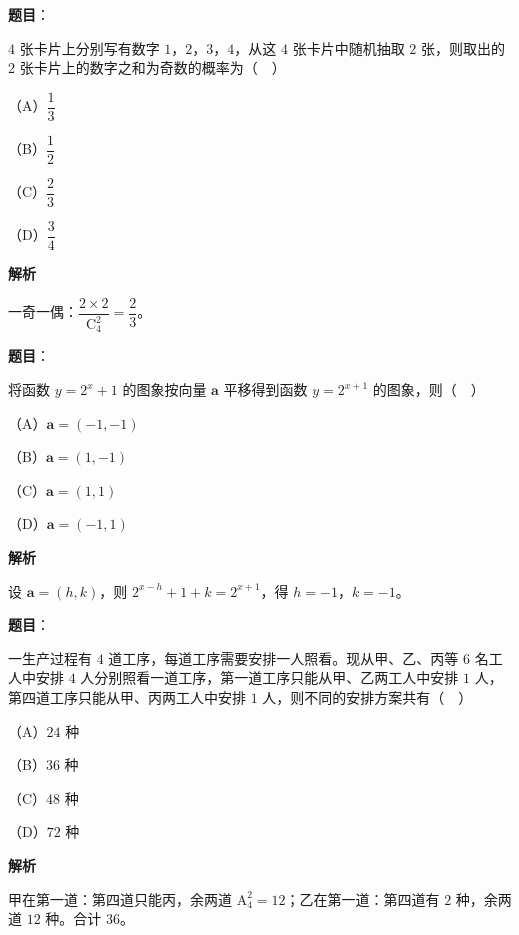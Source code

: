 \begin{answer}

\textbf{题目}：

$4$ 张卡片上分别写有数字 $1$，$2$，$3$，$4$，从这 $4$ 张卡片中随机抽取 $2$ 张，则取出的 $2$ 张卡片上的数字之和为奇数的概率为（　）

（A）$\dfrac13$

（B）$\dfrac12$

（C）$\dfrac23$

（D）$\dfrac34$

\textbf{解析}

一奇一偶：$\dfrac{2\times2}{\mathrm C_4^2}=\dfrac23$。


\end{answer}
\begin{answer}

\textbf{题目}：

将函数 $y=2^x+1$ 的图象按向量 $\boldsymbol a$ 平移得到函数 $y=2^{x+1}$ 的图象，则（　）

（A）$\boldsymbol a=(-1,-1)$

（B）$\boldsymbol a=(1,-1)$

（C）$\boldsymbol a=(1,1)$

（D）$\boldsymbol a=(-1,1)$

\textbf{解析}

设 $\boldsymbol a=(h,k)$，则 $2^{x-h}+1+k=2^{x+1}$，得 $h=-1$，$k=-1$。


\end{answer}
\begin{answer}

\textbf{题目}：

一生产过程有 $4$ 道工序，每道工序需要安排一人照看。现从甲、乙、丙等 $6$ 名工人中安排 $4$ 人分别照看一道工序，第一道工序只能从甲、乙两工人中安排 $1$ 人，第四道工序只能从甲、丙两工人中安排 $1$ 人，则不同的安排方案共有（　）

（A）$24$ 种

（B）$36$ 种

（C）$48$ 种

（D）$72$ 种

\textbf{解析}

甲在第一道：第四道只能丙，余两道 $\mathrm A_4^2=12$；乙在第一道：第四道有 $2$ 种，余两道 $12$ 种。合计 $36$。


\end{answer}

